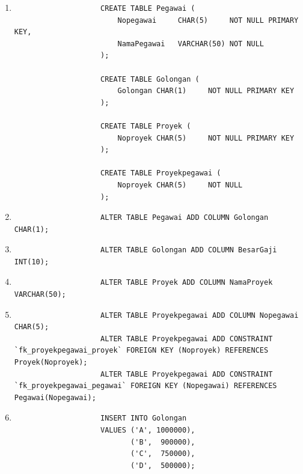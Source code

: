 \documentclass[12pt,titlepage]{article}
\begin{document}
\begin{enumerate}
{        \begin{enumerate}[label=\alph*.]
            \item {
                \begin{verbatim}
                    CREATE TABLE Pegawai (
                        Nopegawai     CHAR(5)     NOT NULL PRIMARY KEY,
                        NamaPegawai   VARCHAR(50) NOT NULL
                    );

                    CREATE TABLE Golongan (
                        Golongan CHAR(1)     NOT NULL PRIMARY KEY
                    );

                    CREATE TABLE Proyek (
                        Noproyek CHAR(5)     NOT NULL PRIMARY KEY
                    );

                    CREATE TABLE Proyekpegawai (
                        Noproyek CHAR(5)     NOT NULL
                    );
                \end{verbatim}
            }
            \item {
                \begin{verbatim}
                    ALTER TABLE Pegawai ADD COLUMN Golongan CHAR(1);
                \end{verbatim}
            }
            \item {
                \begin{verbatim}
                    ALTER TABLE Golongan ADD COLUMN BesarGaji INT(10);
                \end{verbatim}
            }
            \item {
                \begin{verbatim}
                    ALTER TABLE Proyek ADD COLUMN NamaProyek VARCHAR(50);
                \end{verbatim}
            }
            \item {
                \begin{verbatim}
                    ALTER TABLE Proyekpegawai ADD COLUMN Nopegawai CHAR(5);
                    ALTER TABLE Proyekpegawai ADD CONSTRAINT `fk_proyekpegawai_proyek` FOREIGN KEY (Noproyek) REFERENCES Proyek(Noproyek);
                    ALTER TABLE Proyekpegawai ADD CONSTRAINT `fk_proyekpegawai_pegawai` FOREIGN KEY (Nopegawai) REFERENCES Pegawai(Nopegawai);
                \end{verbatim}
            }
            \item {
                \begin{verbatim}
                    INSERT INTO Golongan
                    VALUES ('A', 1000000),
                           ('B',  900000),
                           ('C',  750000),
                           ('D',  500000);


\end{verbatim}}
\end{enumerate}}
\end{enumerate}
\end{document}

